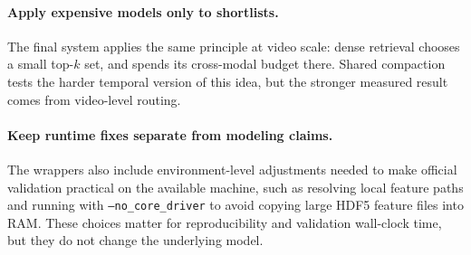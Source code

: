 \paragraph{Apply expensive models only to shortlists.}
The final system applies the same principle at video scale: dense retrieval chooses a small top-$k$ set, and \xml spends its cross-modal budget there. Shared compaction tests the harder temporal version of this idea, but the stronger measured result comes from video-level routing.

\paragraph{Keep runtime fixes separate from modeling claims.}
The \xml wrappers also include environment-level adjustments needed to make official validation practical on the available machine, such as resolving local feature paths and running with \texttt{--no\_core\_driver} to avoid copying large HDF5 feature files into RAM. These choices matter for reproducibility and validation wall-clock time, but they do not change the underlying \xml model.


